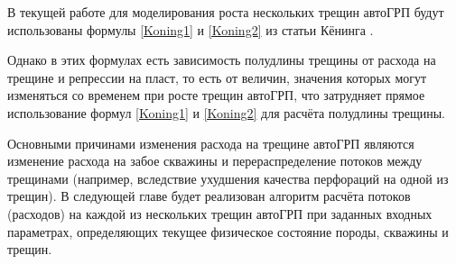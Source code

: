 В текущей работе для моделирования роста нескольких трещин автоГРП будут использованы формулы \eqref{Koning1} и \eqref{Koning2} из статьи Кёнинга \cite{koning}.

Однако в этих формулах есть зависимость полудлины трещины от расхода на трещине и репрессии на пласт, то есть от величин, значения которых могут изменяться со временем при росте трещин автоГРП, что затрудняет прямое использование формул \eqref{Koning1} и \eqref{Koning2} для расчёта полудлины трещины.

Основными причинами изменения расхода на трещине автоГРП являются изменение расхода на забое скважины и перераспределение потоков между трещинами (например, вследствие ухудшения качества перфораций на одной из трещин).
В следующей главе будет реализован алгоритм расчёта потоков (расходов) на каждой из нескольких трещин автоГРП при заданных входных параметрах, определяющих текущее физическое состояние породы, скважины и трещин.




